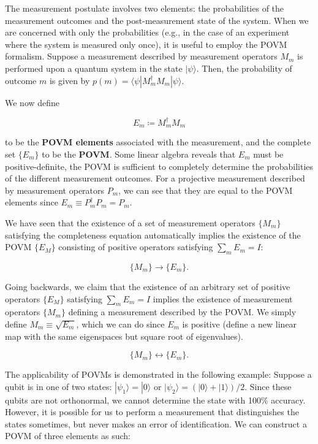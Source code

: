 \documentclass{article}
\theoremstyle{definition}
\begin{document}
    The measurement postulate involves two elements: the probabilities of the measurement outcomes and the post-measurement state of the system. When we are concerned with only the probabilities (e.g., in the case of an experiment where the system is measured only once), it is useful to employ the POVM formalism. Suppose a measurement described by measurement operators $M_m$ is performed upon a quantum system in the state $|\psi\rangle$. Then, the probability of outcome $m$ is given by $p(m) = \langle \psi | M_m^\dagger M_m | \psi \rangle$. 

    We now define

      \[E_m \coloneqq M_m^\dagger M_m\]

    to be the \textbf{POVM elements} associated with the measurement, and the complete set $\{E_m\}$ to be the \textbf{POVM}. Some linear algebra reveals that $E_m$ must be positive-definite, the POVM is sufficient to completely determine the probabilities of the different measurement outcomes. For a projective measurement described by measurement operators $P_m$, we can see that they are equal to the POVM elements since $E_m \equiv P_m^\dagger P_m = P_m$.

    We have seen that the existence of a set of measurement operators $\{M_m\}$ satisfying the completeness equation automatically implies the existence of the POVM $\{E_M\}$ consisting of positive operators satisfying $\sum_m E_m = I$:

      \[\{M_m\} \longrightarrow \{E_m\}.\]

    Going backwards, we claim that the existence of an arbitrary set of positive operators $\{E_M\}$ satisfying $\sum_m E_m = I$ implies the existence of measurement operators $\{M_m\}$ defining a measurement described by the POVM. We simply define $M_m \equiv \sqrt{E_m}$, which we can do since $E_m$ is positive (define a new linear map with the same eigenspaces but square root of eigenvalues).

      \[\{M_m\} \longleftrightarrow \{E_m\}.\]

    The applicability of POVMs is demonstrated in the following example: Suppose a qubit is in one of two states: $|\psi_1 \rangle = |0 \rangle$ or $|\psi_2 \rangle = (|0 \rangle + |1 \rangle)/2$. Since these qubits are not orthonormal, we cannot determine the state with 100\% accuracy. However, it is possible for us to perform a measurement that distinguishes the states sometimes, but never makes an error of identification. We can construct a POVM of three elements as such:
\end{document}
